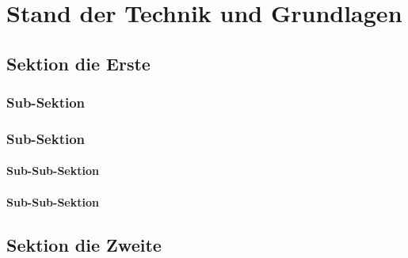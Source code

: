 \chapter{Stand der Technik und Grundlagen}
\label{chap:fundamentals}


\section[head={Sek. 1}]{Sektion die Erste}
\label{sec:section1}

\lipsum[1]


\subsection{Sub-Sektion}
\label{subsec:subsection11}

  \lipsum[2]


\subsection{Sub-Sektion}
\label{subsec:subsection12}

  \lipsum[3]


\subsubsection{Sub-Sub-Sektion}
\label{subsubsec:subsubsection121}

  \lipsum[4]


\subsubsection{Sub-Sub-Sektion}
\label{subsubsec:subsubsection122}

  \lipsum[5]


\section[head={Sek. 2}]{Sektion die Zweite}
\label{sec:section1}

\lipsum[6]



